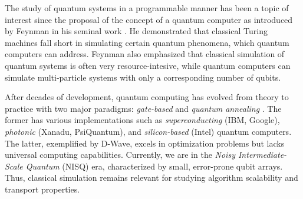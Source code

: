 \documentclass[main.tex]{subfiles}
\begin{document}

The study of quantum systems in a programmable manner has been a topic of
interest since the proposal of the concept of a quantum computer as introduced
by Feynman in his seminal work \cite{feynman1982}. He demonstrated that
classical Turing machines fall short in simulating certain quantum phenomena,
which quantum computers can address. Feynman also emphasized that classical
simulation of quantum systems is often very resource-intesive, while quantum
computers can simulate multi-particle systems with only a corresponding number
of qubits.


After decades of development, quantum computing has evolved from theory to
practice with two major paradigms: \textit{gate-based} and \textit{quantum
annealing} \cite{willschLecture22}. The former has various implementations such as 
\textit{superconducting} (IBM, Google), \textit{photonic} (Xanadu,
PsiQuantum), and \textit{silicon-based} (Intel) quantum computers. The latter,
exemplified by D-Wave, excels in optimization problems but lacks universal computing
capabilities. Currently, we are in the \textit{Noisy Intermediate-Scale
Quantum} (NISQ) era, characterized by small, error-prone qubit arrays. Thus,
classical simulation remains relevant for studying algorithm scalability and
transport properties.
\end{document}
